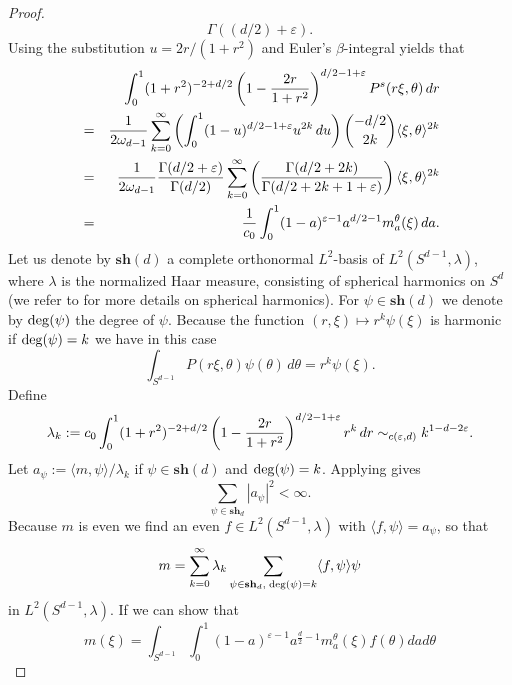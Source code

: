 \documentclass[11pt,a4paper,twoside,draft]{amsart}
\theoremstyle{definition}
\newcommand{\beqla}[1] {\begin {eqnarray}\label{#1}}
\def\eeq {\end {eqnarray}}
\newcommand{\sphe}{{\mathbf s\mathbf h}}
\begin{document}
\begin{proof}
\[                                {\Gamma((d/2)+\varepsilon)}. \]
Using the substitution $u=2r/(1+r^2)$ and Euler's $\beta$-integral yields that
\beqla{eq:3.440}
&   & \int_0^1(1+r^2)^{-2+d/2}
      \left (1-{2r\over 1+r^2}\right )^{d/2-1+\varepsilon}P^s(r\xi,\theta)\, dr
      \nonumber\\
& = & \frac{1}{2\omega_{d-1}} 
      \sum_{k=0}^\infty \left (\int_0^1(1-u)^{d/2-1+\varepsilon}u^{2k}\,du 
      \right ){\binom{-d/2}{2k}}\langle \xi,\theta \rangle^{2k} \nonumber\\
& = & \frac{1}{2\omega_{d-1}} {\frac{\Gamma (d/2 + \varepsilon )}{\Gamma (d/2)}}\sum_{k=0}^\infty 
      \left ({\Gamma (d/2 + 2k )\over\Gamma (d/2+2k+1+\varepsilon )} \right )
      \langle \xi,\theta \rangle^{2k} \nonumber \\
& = & \frac{1}{c_0} 
      \int_0^1(1-a)^{\varepsilon -1}a^{d/2-1}m_a^\theta(\xi)\, da.
\eeq
Let us denote by $\sphe(d)$ a complete orthonormal
$L^2$-basis of $L^2(S^{d-1}, \lambda)$, where $\lambda$ is the normalized
Haar measure, consisting of spherical 
harmonics on $S^d$ (we refer to \cite{Stein2,SteinWeiss} for more details 
on spherical harmonics). For $\psi\in \sphe(d)$ we denote by
${\rm deg}(\psi)$ the degree of $\psi$. Because the function 
$(r,\xi)\mapsto r^k\psi (\xi)$ is harmonic if ${\rm deg}(\psi )=k$
we have in  this case
\begin{equation}\label{eq:eigenvalue_P}
     \int_{S^{d-1}}P(r\xi ,\theta) 
     \psi(\theta)\, d\theta
   = r^k \psi(\xi ). 
\end{equation}
Define
\[    \lambda_k 
   := c_0 \int_0^1 (1+r^2)^{-2+d/2}
          \left (1-{2r\over 1+r^2}\right )^{d/2-1+\varepsilon}r^k\,dr 
  \sim_{c(\varepsilon ,d)}k^{1-d-2\varepsilon}. \]
Let $a_\psi:= \langle m,\psi \rangle/\lambda_k$ if $\psi\in \sphe(d)$ and
${\rm deg}(\psi )=k$. Applying \cite[p. 70]{Stein2} gives 
\[ \sum_{\psi\in \sphe_d} |a_\psi|^2 < \infty. \]
Because $m$ is even we find an even $f\in L^2(S^{d-1},\lambda)$ with
$\langle f,\psi \rangle = a_\psi$, so that
\begin{equation}\label{eq:representation_m}
m = \sum_{k=0}^\infty \lambda_k \sum_{\psi\in \sphe_d,\; {\rm deg}(\psi )=k}
       \langle f,\psi\rangle \psi
\end{equation}
in $L^2(S^{d-1},\lambda)$. If we can show that
\begin{equation}\label{eq:integral_representation_m}
     m(\xi) 
   = \int_{S^{d-1}} \int_0^1 (1-a)^{\varepsilon-1}a^{\frac{d}{2}-1}
     m_a^\theta(\xi) f(\theta) da d\theta
\end{equation}

\end{proof}
\end{document}
